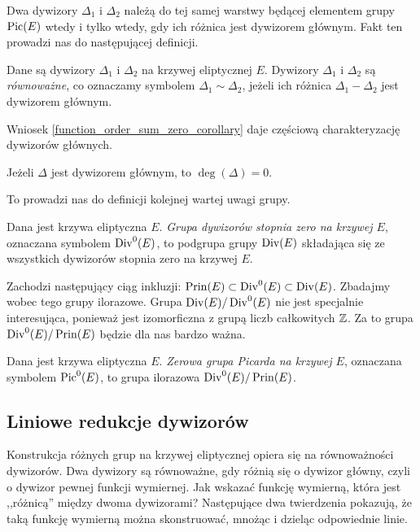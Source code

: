 \noindent
Dwa dywizory $\Delta_1$ i $\Delta_2$ należą do tej samej warstwy
będącej elementem grupy $\operatorname{Pic}(E)$
wtedy i tylko wtedy, gdy ich różnica jest dywizorem głównym.
Fakt ten prowadzi nas do następującej definicji.

\begin{definition}
Dane są dywizory $\Delta_1$ i $\Delta_2$ na krzywej eliptycznej $E$.
Dywizory $\Delta_1$ i $\Delta_2$ są \emph{równoważne},
co oznaczamy symbolem $\Delta_1 \sim \Delta_2$,
jeżeli ich różnica $\Delta_1 - \Delta_2$ jest dywizorem głównym.
\end{definition}

\noindent
Wniosek \ref{function_order_sum_zero_corollary}
daje częściową charakteryzację dywizorów głównych.

\begin{fact}\label{prin_divi_zero_deg_fact}
Jeżeli $\Delta$ jest dywizorem głównym,
to $\deg(\Delta) = 0$.
\end{fact}

\noindent
To prowadzi nas do definicji kolejnej wartej uwagi grupy.

\begin{definition}
Dana jest krzywa eliptyczna $E$.
\emph{Grupa dywizorów stopnia zero na krzywej $E$},
oznaczana symbolem $\operatorname{Div}^0(E)$,
to podgrupa grupy $\operatorname{Div}(E)$
składająca się ze wszystkich dywizorów stopnia zero na krzywej $E$.
\end{definition}

\noindent
Zachodzi następujący ciąg inkluzji:
$\operatorname{Prin}(E) \subset \operatorname{Div}^0(E) \subset \operatorname{Div}(E)$.
Zbadajmy wobec tego grupy ilorazowe.
Grupa $\operatorname{Div}(E) / \operatorname{Div}^0(E)$
nie jest specjalnie interesująca,
ponieważ jest izomorficzna z grupą liczb całkowitych $\mathbb{Z}$.
Za to grupa $\operatorname{Div}^0(E) / \operatorname{Prin}(E)$
będzie dla nas bardzo ważna.

\begin{definition}
Dana jest krzywa eliptyczna $E$.
\emph{Zerowa grupa Picarda na krzywej $E$},
oznaczana symbolem $\operatorname{Pic}^0(E)$,
to grupa ilorazowa $\operatorname{Div}^0(E) / \operatorname{Prin}(E)$.
\end{definition}

\subsection*{Liniowe redukcje dywizorów}

\noindent
Konstrukcja różnych grup na krzywej eliptycznej opiera się
na równoważności dywizorów. Dwa dywizory są równoważne,
gdy różnią się o dywizor główny, czyli o dywizor pewnej funkcji wymiernej.
Jak wskazać funkcję wymierną, która jest ,,różnicą'' między dwoma dywizorami?
Następujące dwa twierdzenia pokazują, że taką funkcję wymierną
można skonstruować, mnożąc i dzieląc odpowiednie linie.

